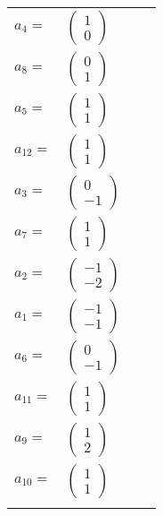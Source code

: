 \documentclass[1p]{elsarticle_modified}
\theoremstyle{definition}
\begin{document}
\begin{tabular}{m{7pt} m{180pt} m{7pt} m{180pt} }
\flushright $a_{4}=$&$\begin{pmatrix}1\\0\end{pmatrix}$ \\
\flushright $a_{8}=$&$\begin{pmatrix}0\\1\end{pmatrix}$ \\
\flushright $a_{5}=$&$\begin{pmatrix}1\\1\end{pmatrix}$ \\
\flushright $a_{12}=$&$\begin{pmatrix}1\\1\end{pmatrix}$ \\
\flushright $a_{3}=$&$\begin{pmatrix}0\\-1\end{pmatrix}$ \\
\flushright $a_{7}=$&$\begin{pmatrix}1\\1\end{pmatrix}$ \\
\flushright $a_{2}=$&$\begin{pmatrix}-1\\-2\end{pmatrix}$ \\
\flushright $a_{1}=$&$\begin{pmatrix}-1\\-1\end{pmatrix}$ \\
\flushright $a_{6}=$&$\begin{pmatrix}0\\-1\end{pmatrix}$ \\
\flushright $a_{11}=$&$\begin{pmatrix}1\\1\end{pmatrix}$ \\
\flushright $a_{9}=$&$\begin{pmatrix}1\\2\end{pmatrix}$ \\
\flushright $a_{10}=$&$\begin{pmatrix}1\\1\end{pmatrix}$\\&\end{tabular}
\end{document}
